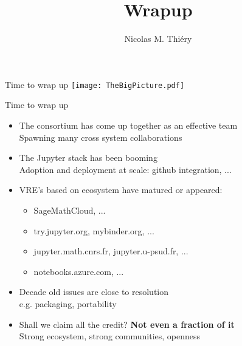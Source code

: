\documentclass{beamer}
\author{Nicolas M. Thiéry}
\title{Wrapup}
\begin{document}
\begin{frame}{Time to wrap up}
  \texttt{[image: TheBigPicture.pdf]}
\end{frame}

\begin{frame}{Time to wrap up}
  \pause
  \begin{itemize}
  \item The consortium has come up together as an effective team\\
    Spawning many cross system collaborations
    \pause\bigskip
  \item The Jupyter stack has been booming\\
    Adoption and deployment at scale: github integration, ...
    \pause\bigskip
  \item VRE's based on ecosystem have matured or appeared:
    \begin{itemize}
    \item SageMathCloud, ...
    \item try.jupyter.org, mybinder.org, ...
    \item jupyter.math.cnrs.fr, jupyter.u-psud.fr, ...
    \item notebooks.azure.com, ...
    \end{itemize}
    \pause\bigskip
  \item Decade old issues are close to resolution\\
    e.g. packaging, portability
    \pause\bigskip
  \item Shall we claim all the credit? \pause \textbf{Not even a fraction of it}\\
    Strong ecosystem, strong communities, openness
  \end{itemize}
\end{frame}
\end{document}
